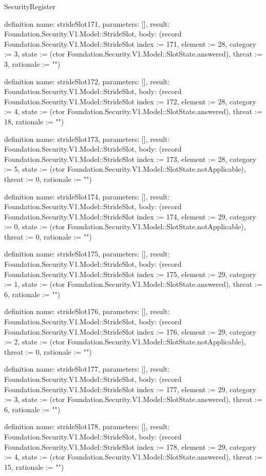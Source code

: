 \begin{lexlean}{SecurityRegister}
\begin{semanticmodule}
definition{
  name: strideSlot171,
  parameters: [],
  result: Foundation.Security.V1.Model::StrideSlot,
  body: (record Foundation.Security.V1.Model::StrideSlot {index := 171, element := 28, category := 3, state := (ctor Foundation.Security.V1.Model::SlotState.answered), threat := 3, rationale := ""})
}

definition{
  name: strideSlot172,
  parameters: [],
  result: Foundation.Security.V1.Model::StrideSlot,
  body: (record Foundation.Security.V1.Model::StrideSlot {index := 172, element := 28, category := 4, state := (ctor Foundation.Security.V1.Model::SlotState.answered), threat := 18, rationale := ""})
}

definition{
  name: strideSlot173,
  parameters: [],
  result: Foundation.Security.V1.Model::StrideSlot,
  body: (record Foundation.Security.V1.Model::StrideSlot {index := 173, element := 28, category := 5, state := (ctor Foundation.Security.V1.Model::SlotState.notApplicable), threat := 0, rationale := ""})
}

definition{
  name: strideSlot174,
  parameters: [],
  result: Foundation.Security.V1.Model::StrideSlot,
  body: (record Foundation.Security.V1.Model::StrideSlot {index := 174, element := 29, category := 0, state := (ctor Foundation.Security.V1.Model::SlotState.notApplicable), threat := 0, rationale := ""})
}

definition{
  name: strideSlot175,
  parameters: [],
  result: Foundation.Security.V1.Model::StrideSlot,
  body: (record Foundation.Security.V1.Model::StrideSlot {index := 175, element := 29, category := 1, state := (ctor Foundation.Security.V1.Model::SlotState.answered), threat := 6, rationale := ""})
}

definition{
  name: strideSlot176,
  parameters: [],
  result: Foundation.Security.V1.Model::StrideSlot,
  body: (record Foundation.Security.V1.Model::StrideSlot {index := 176, element := 29, category := 2, state := (ctor Foundation.Security.V1.Model::SlotState.notApplicable), threat := 0, rationale := ""})
}

definition{
  name: strideSlot177,
  parameters: [],
  result: Foundation.Security.V1.Model::StrideSlot,
  body: (record Foundation.Security.V1.Model::StrideSlot {index := 177, element := 29, category := 3, state := (ctor Foundation.Security.V1.Model::SlotState.answered), threat := 6, rationale := ""})
}

definition{
  name: strideSlot178,
  parameters: [],
  result: Foundation.Security.V1.Model::StrideSlot,
  body: (record Foundation.Security.V1.Model::StrideSlot {index := 178, element := 29, category := 4, state := (ctor Foundation.Security.V1.Model::SlotState.answered), threat := 15, rationale := ""})
}


\end{semanticmodule}
\end{lexlean}
